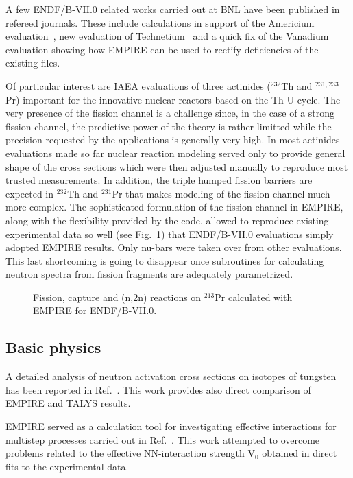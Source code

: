 A few ENDF/B-VII.0 related works carried out at BNL have been published in
refereed journals. These include calculations in support of the Americium
evaluation~\cite{Rochman:06a}, new evaluation of Technetium~\cite%
{Rochman:07c} and a quick fix of the Vanadium~\cite{Rochman:06b} evaluation
showing how EMPIRE can be used to rectify deficiencies of the existing files.

Of particular interest are IAEA evaluations of three actinides ($^{232}$Th
and $^{231,233}$Pr) important for the innovative nuclear reactors based on
the Th-U cycle. The very presence of the fission channel is a challenge
since, in the case of a strong fission channel, the predictive power of the
theory is rather limitted while the precision requested by the applications
is generally very high. In most actinides evaluations made so far nuclear
reaction modeling served only to provide general shape of the cross sections
which were then adjusted manually to reproduce most trusted measurements. In
addition, the triple humped fission barriers are expected in $^{232}$Th and $%
^{231}$Pr that makes modeling of the fission channel much more complex. The
sophisticated formulation of the fission channel in EMPIRE, along with the
flexibility provided by the code, allowed to reproduce existing experimental
data so well (see Fig.~\ref{231Pr}) that ENDF/B-VII.0 evaluations simply
adopted EMPIRE results. Only nu-bars were taken over from other evaluations.
This last shortcoming is going to disappear once subroutines for calculating
neutron spectra from fission fragments are adequately parametrized.

\begin{figure}[htbp]
\caption{Fission, capture and (n,2n) reactions on $^{213}$Pr calculated with
EMPIRE for ENDF/B-VII.0.}
\label{231Pr}
\end{figure}

\subsection{Basic physics}

A detailed analysis of neutron activation cross sections on isotopes of
tungsten has been reported in Ref.~\cite{Avrigeanu:06}. This work provides
also direct comparison of EMPIRE and TALYS results.

EMPIRE served as a calculation tool for investigating effective interactions
for multistep processes carried out in Ref.~\cite{avrigeanu2001eim}. This
work attempted to overcome problems related to the effective NN-interaction
strength V$_0$ obtained in direct fits to the experimental data.

